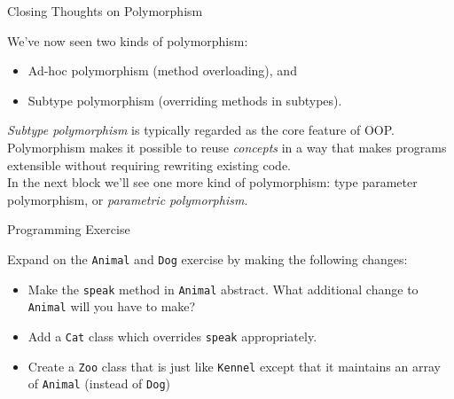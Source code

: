 \documentclass{beamer}
\begin{document}
\begin{frame}[fragile]{Closing Thoughts on Polymorphism}

We've now seen two kinds of polymorphism:
\begin{itemize}
\item Ad-hoc polymorphism (method overloading), and
\item Subtype polymorphism (overriding methods in subtypes).
\end{itemize}

{\it Subtype polymorphism} is typically regarded as the core feature of OOP.  Polymorphism makes it possible to reuse {\it concepts} in a way that makes programs extensible without requiring rewriting existing code.\\
\vspace{.1in}
In the next block we'll see one more kind of polymorphism: type parameter polymorphism, or {\it parametric polymorphism}.
\end{frame}


\begin{frame}[fragile]{Programming Exercise}


Expand on the {\tt Animal} and {\tt Dog} exercise by making the following changes:
\begin{itemize}
\item Make the {\tt speak} method in {\tt Animal} abstract.  What additional change to {\tt Animal} will you have to make?
\item Add a {\tt Cat} class which overrides {\tt speak} appropriately.
\item Create a {\tt Zoo} class that is just like {\tt Kennel} except that it
 maintains an array of {\tt Animal} (instead of {\tt Dog})
\end{itemize}


\end{frame}








\end{document}
